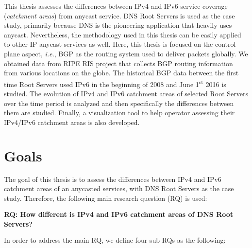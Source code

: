 This thesis assesses the differences between IPv4 and IPv6 service coverage (\textit{catchment areas}) from anycast service. DNS Root Servers is used as the case study, primarily because DNS is the pioneering application that heavily uses anycast. Nevertheless, the methodology used in this thesis can be easily applied to other IP-anycast services as well. Here, this thesis is focused on the control plane aspect, \textit{i.e.}, BGP as the routing system used to deliver packets globally. We obtained data from RIPE RIS project \cite{ripe-ncc-ris} that collects BGP routing information from various locations on the globe. The historical BGP data between the first time Root Servers used IPv6 in the beginning of 2008 and June 1\textsuperscript{st} 2016 is studied. The evolution of IPv4 and IPv6 catchment areas of selected Root Servers over the time period is analyzed and then specifically the differences between them are studied. Finally, a visualization tool to help operator assessing their IPv4/IPv6 catchment areas is also developed.


\section{Goals}
\label{ch01:goals}

The goal of this thesis is to assess the differences between IPv4 and IPv6 catchment areas of an anycasted services, with DNS Root Servers as the case study. Therefore, the following main research question (RQ) is used:

\textbf{RQ: How different is IPv4 and IPv6 catchment areas of DNS Root Servers?}

In order to address the main RQ, we define four sub RQs as the following: 

